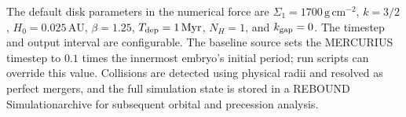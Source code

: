 The default disk parameters in the numerical force are
$\Sigma_1=1700\,\mathrm{g\,cm^{-2}}$, $k=3/2$,
$H_0=0.025\,\mathrm{AU}$, $\beta=1.25$,
$T_{\rm dep}=1\,\mathrm{Myr}$, $N_H=1$, and $k_{\rm gap}=0$.
The timestep and output interval are configurable. The baseline source
sets the MERCURIUS timestep to $0.1$ times the innermost embryo's initial
period; run scripts can override this value. Collisions are detected
using physical radii and resolved as perfect mergers, and the full
simulation state is stored in a REBOUND Simulationarchive for subsequent
orbital and precession analysis.
